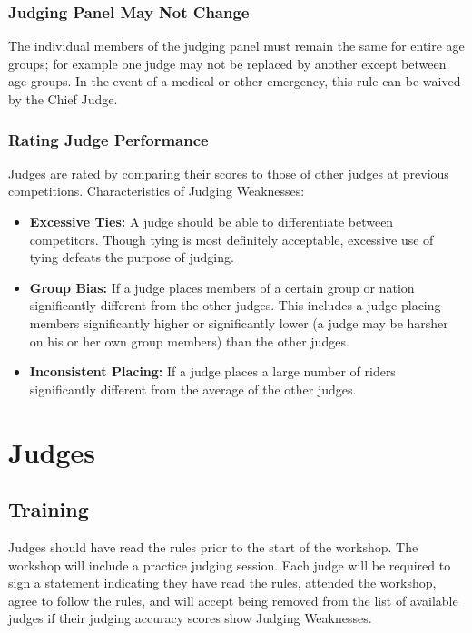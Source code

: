 \subsubsection{Judging Panel May Not Change}
The individual members of the judging panel must remain the same for entire age groups; for example one judge may not be replaced by another except between age groups.
In the event of a medical or other emergency, this rule can be waived by the Chief Judge.

\subsubsection{Rating Judge Performance}
Judges are rated by comparing their scores to those of other judges at previous competitions.
Characteristics of Judging Weaknesses:
\begin{itemize}
\item \textbf{Excessive Ties:}
A judge should be able to differentiate between competitors.
Though tying is most definitely acceptable, excessive use of tying defeats the purpose of judging.
\item \textbf{Group Bias:}
If a judge places members of a certain group or nation significantly different from the other judges.
This includes a judge placing members significantly higher or significantly lower (a judge may be harsher on his or her own group members) than the other judges.
\item\textbf{Inconsistent Placing:}
If a judge places a large number of riders significantly different from the average of the other judges.
\end{itemize}

\section{Judges}

\subsection{Training}
Judges should have read the rules prior to the start of the workshop.
The workshop will include a practice judging session.
Each judge will be required to sign a statement indicating they have read the rules, attended the workshop, agree to follow the rules, and will accept being removed from the list of available judges if their judging accuracy scores show Judging Weaknesses.


